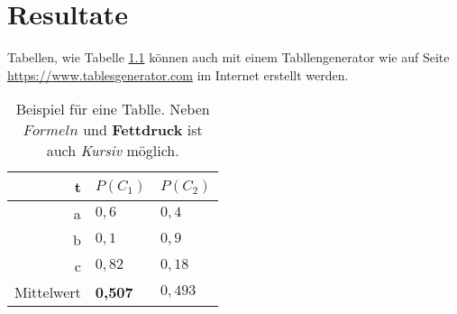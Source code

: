 
\chapter{Resultate} %
\label{chap:resultate}

Tabellen, wie Tabelle \ref{tab:example} können auch mit einem Tabllengenerator wie auf Seite \url{https://www.tablesgenerator.com} im Internet erstellt werden.
\begin{table}[h]
    \centering
    \begin{tabular}{|r||l|l|}\hline
        t & $P(C_1)$ & $P(C_2)$\\\hline
        a & $0,6$ & $0,4$\\\hline
        b & $0,1$ & $0,9$\\\hline
        c & $0,82$ & $0,18$\\\hline\hline
        Mittelwert & \textbf{0,507} & $0,493$\\\hline
    \end{tabular}
    \caption{Beispiel für eine Tablle. Neben $Formeln$ und \textbf{Fettdruck} ist auch \textit{Kursiv} möglich.}
    \label{tab:example}
\end{table}
